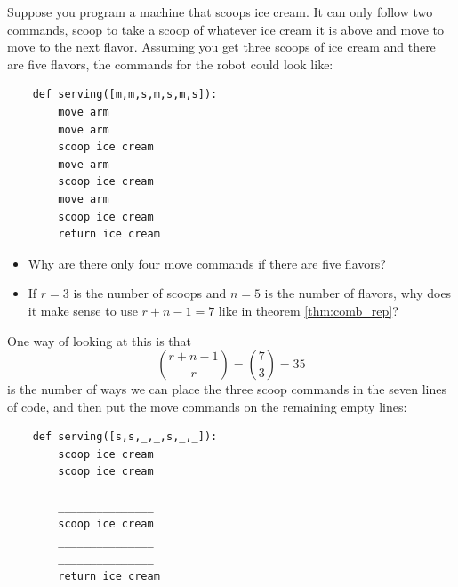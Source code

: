 \begin{exposition}
    Suppose you program a machine that scoops ice cream.  It can only follow two commands, scoop to take a scoop of whatever ice cream it is above and move to move to the next flavor.  Assuming you get three scoops of ice cream and there are five flavors, the commands for the robot could look like:

    \begin{verbatim}
    def serving([m,m,s,m,s,m,s]):
        move arm
        move arm
        scoop ice cream
        move arm
        scoop ice cream
        move arm
        scoop ice cream
        return ice cream
    \end{verbatim}        

    \begin{itemize}
        \item Why are there only four move commands if there are five flavors?
        \item If \(r=3\) is the number of scoops and \(n=5\) is the number of flavors, why does it make sense to use \(r+n-1=7\) like in theorem \ref{thm:comb_rep}?
    \end{itemize}

    One way of looking at this is that 
    \[
        \binom{r+n-1}{r}=\binom{7}{3}=35
    \]
    is the number of ways we can place the three scoop commands in the seven lines of code, and then put the move commands on the remaining empty lines:
    \begin{verbatim}
    def serving([s,s,_,_,s,_,_]):
        scoop ice cream
        scoop ice cream
        _______________ 
        _______________ 
        scoop ice cream
        _______________ 
        _______________ 
        return ice cream
    \end{verbatim}
\end{exposition}


